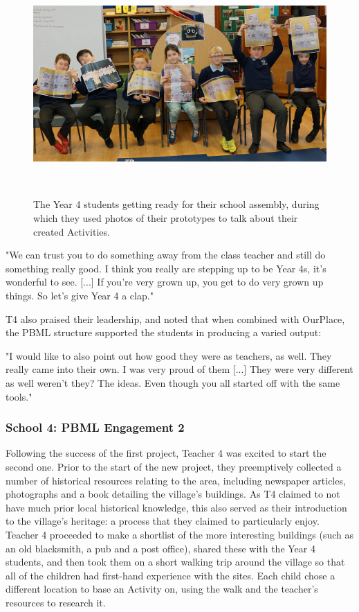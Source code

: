 \begin{figure}
\centering
  \includegraphics[width=0.8\columnwidth]{images/chapter08/assembly.jpg}
  \caption[Year 4 students hosting a school assembly to talk about their Activities]{The Year 4 students getting ready for their school assembly, during which they used photos of their prototypes to talk about their created Activities.}~\label{fig:Assembly}
\end{figure}

\begin{displayquote}
"We can trust you to do something away from the class teacher and still do something really good. I think you really are stepping up to be Year 4s, it's wonderful to see. [...] If you're very grown up, you get to do very grown up things. So let's give Year 4 a clap."
\end{displayquote}

T4 also praised their leadership, and noted that when combined with OurPlace, the PBML structure supported the students in producing a varied output:

\begin{displayquote}
"I would like to also point out how good they were as teachers, as well. They really came into their own. I was very proud of them [...] They were very different as well weren't they? The ideas. Even though you all started off with the same tools."
\end{displayquote}

\subsubsection{School 4: PBML Engagement 2}

Following the success of the first project, Teacher 4 was excited to start the second one. Prior to the start of the new project, they preemptively collected a number of historical resources relating to the area, including newspaper articles, photographs and a book detailing the village's buildings. As T4 claimed to not have much prior local historical knowledge, this also served as their introduction to the village's heritage: a process that they claimed to particularly enjoy. Teacher 4 proceeded to make a shortlist of the more interesting buildings (such as an old blacksmith, a pub and a post office), shared these with the Year 4 students, and then took them on a short walking trip around the village so that all of the children had first-hand experience with the sites. Each child chose a different location to base an Activity on, using the walk and the teacher's resources to research it.

